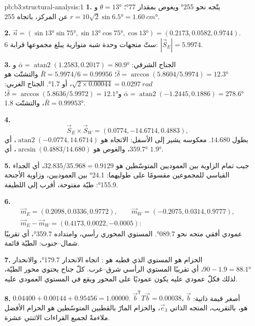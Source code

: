 \begin{solution}{pb:b3:structural-analysis:1}
\textbf{1.} يتّجه  نحو \ang{255} ويغوص بمقدار \ang{77}؛ $\theta =
\ang{13}$ و$r = 10\sqrt2\sin\ang{6.5} = \qty{1.60}{cm}$ عن المركز،
باتجاه \ang{255}.

\textbf{2.} $\vec n = (\sin\ang{13}\sin\ang{75}, \sin\ang{13}\cos\ang{75},
\cos\ang{13}) = (0.2173, 0.0582, 0.9744)$. ستّ متجهات وحدة شبه متوازية
يبلغ مجموعها قرابة 6: $|\vec S_E| = 5.9974$.

\textbf{3.} الجناح الشرقي: $\bar\alpha = \operatorname{atan2}(1.2583, 0.2017) =
\ang{80.9}$ و$\bar\delta = \arccos(5.8604/5.9974) = \ang{12.3}$؛ $\bar R
= 5.9974/6 = 0.99956$ والتشتّت هو $\sqrt{2\times0.00044} =
\qty{0.0297}{rad}$، أو \ang{1.7}. الجناح الغربي: $\bar\alpha =
\operatorname{atan2}(-1.2445, 0.1886) = \ang{278.6}$ و$\bar\delta =
\arccos(5.8636/5.9972) = \ang{12.1}$؛ $\bar R = 0.99953$، والتشتّت \ang{1.8}.

\textbf{4.}
\[
  \vec S_E\times\vec S_W = (0.0774, -14.6714, 0.4883),
\]
بطول $14.680$. معكوسه يشير إلى الأسفل: الاتجاه هو $\operatorname{atan2}(-0.0774, 14.6714)$، أي $\ang{359.7}$،
والغوص هو $\arcsin(0.4883/14.680)$، أي $\ang{1.9}$.

\textbf{5.} جيب تمام الزاوية بين العموديين المتوسّطين هو
$32.835/35.968 = 0.9129$، أي الجداء القياسي للمجموعين مقسومًا على
طوليهما: \ang{24.1} بين العموديين، وزاوية الأجنحة \ang{155.9}:
طيّة مفتوحة، أقرب إلى اللطيفة.

\textbf{6.}
\begin{gather*}
  \vec m_E = (0.2098, 0.0336, 0.9772),\qquad \vec m_W = (-0.2075, 0.0314, 0.9777),\\
  \vec m_E - \vec m_W = (0.4173, 0.0022, -0.0005):
\end{gather*}
عمودي أفقي متجه نحو \ang{089.7}. المستوي المحوري رأسي، وامتداده
\ang{359.7}، أي تقريبًا شمال--جنوب: الطيّة قائمة.

\textbf{7.} الحزام هو المستوي الذي قطبه هو : اتجاه الانحدار
\ang{179.7}، والانحدار $90 - 1.9 = \ang{88.1}$، أي تقريبًا المستوي الرأسي
شرق--غرب. كلّ جناح يحتوي محور الطيّة، لذلك فكلّ عمودي عليه يكون عموديًا على المحور
ويقع في المستوي العمودي عليه.

\textbf{8.} $0.04400 + 0.00144 + 0.95456 = 1.00000$. $\vec b^{\mathsf T}T\vec
b = 0.00038$، أصغر قيمة ذاتية: $\vec b$ هو، بالتقريب، المتجه الذاتي
$\vec e_3$، والحزام المارّ بالقطبين المتوسّطين هو
الحزام الأفضل ملاءمةً لجميع القراءات الاثنتي عشرة.


\end{solution}
